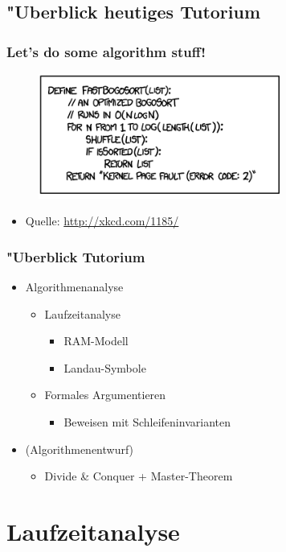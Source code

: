\subsection{"Uberblick heutiges Tutorium}
\begin{frame}[fragile]
  \frametitle{Let's do some algorithm stuff!}
  \begin{figure}[!t]
    \includegraphics[width=300px]{fastbogosort.png}
    \label{fig:fastbogosort}
  \end{figure}
  \begin{itemize}
  \item Quelle: \url{http://xkcd.com/1185/}
  \end{itemize}
\end{frame}

\begin{frame}
  \frametitle{"Uberblick Tutorium}
  \begin{itemize}
  \item Algorithmenanalyse
    \begin{itemize}
    \item Laufzeitanalyse
      \begin{itemize}
      \item RAM-Modell
      \item Landau-Symbole
      \end{itemize}
    \item Formales Argumentieren
      \begin{itemize}
      \item Beweisen mit Schleifeninvarianten
      \end{itemize}
    \end{itemize}
  \item (Algorithmenentwurf)
    \begin{itemize}
    \item Divide \& Conquer + Master-Theorem
    \end{itemize}
  \end{itemize}
\end{frame}

\section{Laufzeitanalyse}
